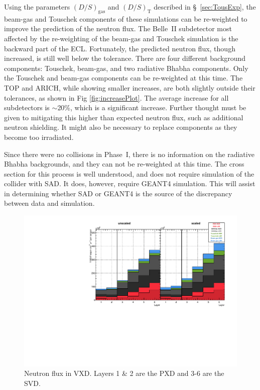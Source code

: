 Using the parameters $(D/S)_{\mathrm{gas}}$ and $(D/S)_{\mathrm{T}}$ described in \S~\ref{sec:TousExp}, the beam-gas and Touschek components of these simulations can be re-weighted to improve the prediction of the neutron flux. The Belle~II subdetector most affected by the re-weighting of the beam-gas and Touschek simulation is the backward part of the ECL. Fortunately, the predicted neutron flux, though increased, is still well below the tolerance. There are four different background components: Touschek, beam-gas, and two radiative Bhabha components. Only the Touschek and beam-gas components can be re-weighted at this time. The TOP and ARICH, while showing smaller increases, are both slightly outside their tolerances, as shown in Fig \ref{fig:increasePlot}. The average increase for all subdetectors is $\sim$20\%, which is a significant increase. Further thought must be given to mitigating this higher than expected neutron flux, such as additional neutron shielding. It might also be necessary to replace components as they become too irradiated.


Since there were no collisions in Phase~I, there is no information on the radiative Bhabha backgrounds, and they can not be re-weighted at this time. The cross section for this process is well understood, and does not require simulation of the collider with SAD. It does, however, require GEANT4 simulation. This will assist in determining whether SAD or GEANT4 is the source of the discrepancy between data and simulation.





\begin{figure}[htb]
	\centerfloat
		\includegraphics[width=\textwidth]{images/hVXDFlux}
	\caption[Neutron flux in VXD]{Neutron flux in VXD. Layers 1 \& 2 are the PXD and 3-6 are the SVD.}	
	\label{fig:VXDFlux}
\end{figure}

